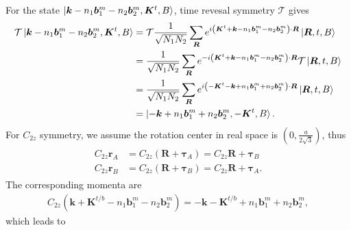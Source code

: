\documentclass[10pt, oneside]{article}
\newcommand{\p}[1]{\left(#1\right)}
\begin{document}
For the state \(\ket{\bm{k} -n_{1} \bm{b}^{m}_{1} - n_{2} \bm{b}^{m}_{2}, \bm{K}^{t}, B}\), time revesal symmetry \(\mathcal{T}\) gives 
\begin{align}
	\begin{split}
		\mathcal{T}\ket{\bm{k} -n_{1} \bm{b}^{m}_{1} - n_{2} \bm{b}^{m}_{2}, \bm{K}^{t}, B} & = \mathcal{T} \frac{1}{\sqrt{N_1 N_{2}}} \sum_{\bm{R}} e^{i \p{\bm{K}^{t} + \bm{k} - n_{1} \bm{b}^{m}_{1} - n_{2} \bm{b}^{m}_{2}} \cdot \bm{R}} \ket{\bm{R}, t, B} \\
		& = \frac{1}{\sqrt{N_1 N_{2}}} \sum_{\bm{R}} e^{- i \p{\bm{K}^{t} + \bm{k} - n_{1} \bm{b}^{m}_{1} - n_{2} \bm{b}^{m}_{2}} \cdot \bm{R}} \mathcal{T} \ket{\bm{R}, t, B} \\
		& = \frac{1}{\sqrt{N_1 N_{2}}} \sum_{\bm{R}} e^{ i \p{ - \bm{K}^{t} - \bm{k} + n_{1} \bm{b}^{m}_{1} + n_{2} \bm{b}^{m}_{2}} \cdot \bm{R}} \ket{\bm{R}, t, B} \\
		& = \ket{ - \bm{k} + n_{1} \bm{b}^{m}_{1} + n_{2} \bm{b}^{m}_{2}, - \bm{K}^{t}, B}.
	\end{split}
\end{align}
For \(C_{2z}\) symmetry, we assume the rotation center in real space is \(\p{0,\frac{a}{2\sqrt{3}}}\), thus 
\begin{align}
	\begin{split}
		C_{2z} \bm{r}_{A} &= C_{2z} \p{\bm{R} + \bm{\tau}_{A}} = C_{2z} \bm{R} + \bm{\tau}_{B} \\
	C_{2z} \bm{r}_{B}& = C_{2z} \p{\bm{R} + \bm{\tau}_{B}} = C_{2z} \bm{R} + \bm{\tau}_{A}.
	\end{split}
\end{align}
The corresponding momenta are 
\begin{align}
	C_{2z} \p{\bm{k} + \bm{K}^{t/b} - n_{1} \bm{b}^{m}_{1} - n_{2} \bm{b}^{m}_{2}} = - \bm{k} - \bm{K}^{t/b} + n_{1} \bm{b}^{m}_{1} + n_{2} \bm{b}^{m}_{2},
\end{align}
which leads to 
\end{document}
